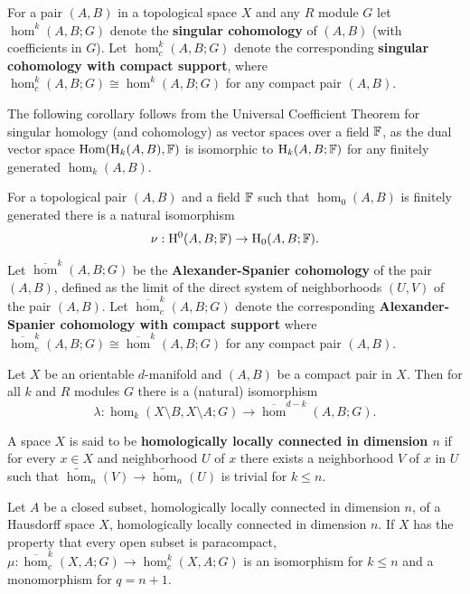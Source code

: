 
For a pair $(A, B)$ in a topological space $X$ and any $R$ module $G$ let $\hom^k(A, B; G)$ denote the \textbf{singular cohomology} of $(A,B)$ (with coefficients in $G$).
Let $\hom^k_c(A, B; G)$ denote the corresponding \textbf{singular cohomology with compact support}, where $\hom^k_c(A, B; G)\cong \hom^k(A, B; G)$ for any compact pair $(A,B)$.

The following corollary follows from the Universal Coefficient Theorem for singular homology (and cohomology) as vector spaces over a field $\mathbb{F}$, as the dual vector space $\mathrm{Hom}(\mathrm{H}_k(A, B), \mathbb{F})$ is isomorphic to $\mathrm{H}_k(A, B; \mathbb{F})$ for any finitely generated $\hom_k(A, B)$.

\begin{corollary}\label{cor:univ_coef}
  For a topological pair $(A, B)$ and a field $\mathbb{F}$ such that $\hom_0(A, B)$ is finitely generated there is a natural isomorphism
  \[\nu : \mathrm{H}^0(A, B; \mathbb{F})\to \mathrm{H}_0(A, B; \mathbb{F}).\]
\end{corollary}

Let $\overline{\hom}^k(A, B; G)$ be the \textbf{Alexander-Spanier cohomology} of the pair $(A,B)$, defined as the limit of the direct system of neighborhoods $(U,V)$ of the pair $(A, B)$.
Let $\overline{\hom}^k_c(A, B; G)$ denote the corresponding \textbf{Alexander-Spanier cohomology with compact support} where $\overline{\hom}^k_c(A, B; G)\cong\overline{\hom}^k(A, B; G)$ for any compact pair $(A, B)$.

\begin{theorem}\label{thm:alexander}
  Let $X$ be an orientable $d$-manifold and $(A, B)$ be a compact pair in $X$.
  Then for all $k$ and $R$ modules $G$ there is a (natural) isomorphism
  \[\lambda : \hom_k(X\setminus B, X\setminus A; G)\to \overline{\hom}^{d-k}(A, B; G).\]
\end{theorem}

A space $X$ is said to be \textbf{homologically locally connected in dimension $n$} if for every $x\in X$ and neighborhood $U$ of $x$ there exists a neighborhood $V$ of $x$ in $U$ such that $\tilde{\hom}_n(V)\to\tilde{\hom}_n(U)$ is trivial for $k\leq n$.

\begin{lemma}\label{lem:alexander_iso}
  Let $A$ be a closed subset, homologically locally connected in dimension $n$, of a Hausdorff space $X$, homologically locally connected in dimension $n$.
  If $X$ has the property that every open subset is paracompact, $\mu : \overline{\hom}_c^k(X,A; G)\to \hom_c^k(X, A; G)$ is an isomorphism for $k\leq n$ and a monomorphism for $q = n+1$.
\end{lemma}

